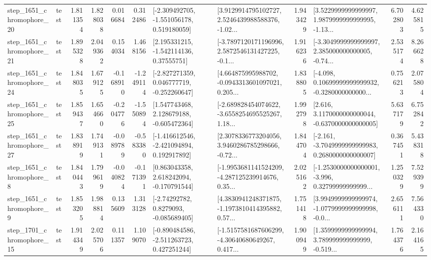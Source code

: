 \begin{tabular}{llrrrrllrlrr}
 step\_1651\_chromophore\_20 &      test &      1.811354 &    1.828038 &      0.016684 &  0.312486 &   [-2.309492705, -1.551056178, 0.519180059] &  [3.9129914795102727, 2.5246439988588376, -1.02... &       1.943429 &  [3.5229999999999997, 1.9879999999999995, -1.13... &            6.702803 &          4.625815 \\
 step\_1651\_chromophore\_21 &      test &      1.895328 &    2.049362 &      0.154034 &  1.468156 &     [2.195331215, -1.542114136, 0.37555751] &  [-3.7897120171196996, 2.5872546131427225, -0.1... &       1.916236 &  [-3.3049999999999997, 2.385000000000005, -0.74... &            2.535174 &          8.266628 \\
 step\_1651\_chromophore\_24 &      test &      1.848035 &    1.679125 &     -0.168910 & -1.249114 &   [-2.827271359, 0.046777719, -0.252260647] &  [4.664875995988702, -0.0943313601097021, 0.205... &       1.838805 &  [-4.098, 0.10699999999999932, -0.3280000000000... &            0.756213 &          2.075804 \\
 step\_1651\_chromophore\_25 &      test &      1.859437 &    1.654660 &     -0.204776 & -1.550894 &    [1.547743468, 2.128679188, -0.605472364] &  [-2.689828454074622, -3.6558254695525267, 1.18... &       1.992798 &   [2.616, 3.1170000000000044, -0.6370000000000005] &            5.637179 &          6.752842 \\
 step\_1651\_chromophore\_27 &      test &      1.838919 &    1.749131 &     -0.089789 & -0.583380 &   [-1.416612546, -2.421094894, 0.192917892] &  [2.3078336773204056, 3.9460286785298666, -0.72... &       1.844704 &  [-2.161, -3.7049999999999983, 0.2680000000000007] &            0.367451 &          5.438318 \\
  step\_1651\_chromophore\_8 &      test &      1.840443 &    1.799619 &     -0.040824 & -0.171391 &    [0.863043358, 2.618242094, -0.170791544] &  [-1.9953681141524209, -4.287125239914676, 0.35... &       2.025162 &  [-1.2530000000000001, -3.996, 0.32799999999999... &            1.250329 &          7.529399 \\
  step\_1651\_chromophore\_9 &      test &      1.853205 &    1.988814 &      0.135609 &  1.313128 &      [-2.74292782, 0.8279093, -0.085689405] &  [4.3830941248371875, -1.1973810414395882, 0.57... &       1.751418 &  [3.9949999999999974, -1.0779999999999998, -0.0... &            2.656111 &          7.564330 \\
 step\_1701\_chromophore\_15 &      test &      1.914349 &    2.025706 &      0.111357 &  1.109070 &   [-0.890484586, -2.511263723, 0.427251244] &  [-1.5157581687606299, -4.30640680649267, 0.417... &       1.900949 &  [1.3599999999999994, 3.789999999999999, -0.519... &            1.764376 &          2.164165 \\

\end{tabular}
